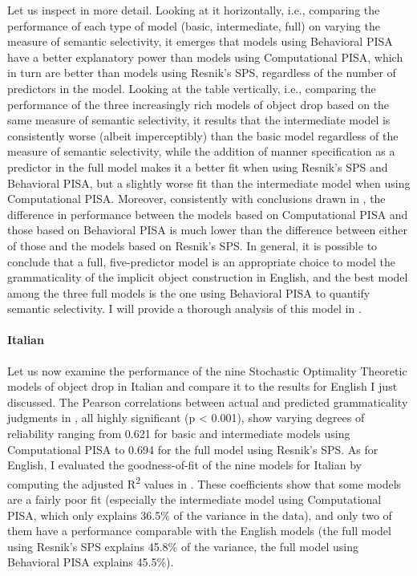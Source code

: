 Let us inspect  in more detail. Looking at it horizontally, i.e., comparing the performance of each type of model (basic, intermediate, full) on varying the measure of semantic selectivity, it emerges that models using Behavioral PISA have a better explanatory power than models using Computational PISA, which in turn are better than models using Resnik's SPS, regardless of the number of predictors in the model. Looking at the table vertically, i.e., comparing the performance of the three increasingly rich models of object drop based on the same measure of semantic selectivity, it results that the intermediate model is consistently worse (albeit imperceptibly) than the basic model regardless of the measure of semantic selectivity, while the addition of manner specification as a predictor in the full model makes it a better fit when using Resnik's SPS and Behavioral PISA, but a slightly worse fit than the intermediate model when using Computational PISA. Moreover, consistently with conclusions drawn in , the difference in performance between the models based on Computational PISA and those based on Behavioral PISA is much lower than the difference between either of those and the models based on Resnik's SPS. In general, it is possible to conclude that a full, five-predictor model is an appropriate choice to model the grammaticality of the implicit object construction in English, and the best model among the three full models is the one using Behavioral PISA to quantify semantic selectivity. I will provide a thorough analysis of this model in .

\paragraph{Italian} Let us now examine the performance of the nine Stochastic Optimality Theoretic models of object drop in Italian and compare it to the results for English I just discussed. The Pearson correlations between actual and predicted grammaticality judgments in , all highly significant (p < 0.001), show varying degrees of reliability ranging from 0.621 for basic and intermediate models using Computational PISA to 0.694 for the full model using Resnik's SPS. As for English, I evaluated the goodness-of-fit of the nine models for Italian by computing the adjusted R\textsuperscript{2} values in . These coefficients show that some models are a fairly poor fit (especially the intermediate model using Computational PISA, which only explains 36.5\% of the variance in the data), and only two of them have a performance comparable with the English models (the full model using Resnik's SPS explains 45.8\% of the variance, the full model using Behavioral PISA explains 45.5\%).

